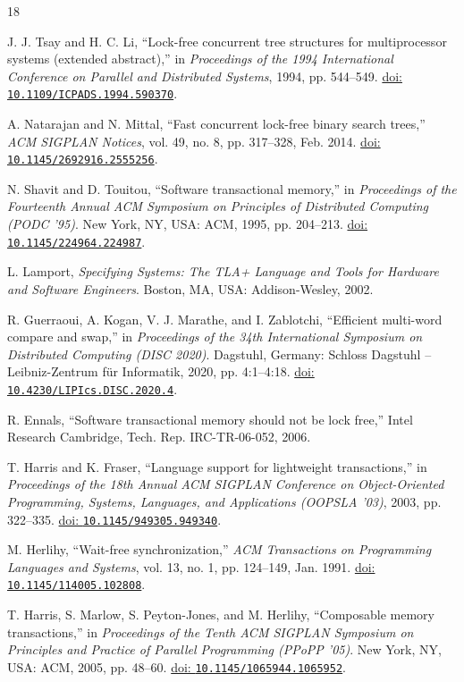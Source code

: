 \newcommand{\doi}[1]{\href{https://doi.org/#1}{doi: \nolinkurl{#1}}}

\begin{thebibliography}{18}

J. J. Tsay and H. C. Li, ``Lock-free concurrent tree structures for multiprocessor systems (extended abstract),'' in \textit{Proceedings of the 1994 International Conference on Parallel and Distributed Systems}, 1994, pp. 544--549. \doi{10.1109/ICPADS.1994.590370}.

A. Natarajan and N. Mittal, ``Fast concurrent lock-free binary search trees,'' \textit{ACM SIGPLAN Notices}, vol. 49, no. 8, pp. 317--328, Feb. 2014. \doi{10.1145/2692916.2555256}.

N. Shavit and D. Touitou, ``Software transactional memory,'' in \textit{Proceedings of the Fourteenth Annual ACM Symposium on Principles of Distributed Computing (PODC '95)}. New York, NY, USA: ACM, 1995, pp. 204--213. \doi{10.1145/224964.224987}.

L. Lamport, \textit{Specifying Systems: The TLA+ Language and Tools for Hardware and Software Engineers}. Boston, MA, USA: Addison-Wesley, 2002.

R. Guerraoui, A. Kogan, V. J. Marathe, and I. Zablotchi, ``Efficient multi-word compare and swap,'' in \textit{Proceedings of the 34th International Symposium on Distributed Computing (DISC 2020)}. Dagstuhl, Germany: Schloss Dagstuhl -- Leibniz-Zentrum für Informatik, 2020, pp. 4:1--4:18. \doi{10.4230/LIPIcs.DISC.2020.4}.

R. Ennals, ``Software transactional memory should not be lock free,'' Intel Research Cambridge, Tech. Rep. IRC-TR-06-052, 2006.

T. Harris and K. Fraser, ``Language support for lightweight transactions,'' in \textit{Proceedings of the 18th Annual ACM SIGPLAN Conference on Object-Oriented Programming, Systems, Languages, and Applications (OOPSLA '03)}, 2003, pp. 322--335. \doi{10.1145/949305.949340}.

M. Herlihy, ``Wait-free synchronization,'' \textit{ACM Transactions on Programming Languages and Systems}, vol. 13, no. 1, pp. 124--149, Jan. 1991. \doi{10.1145/114005.102808}.

T. Harris, S. Marlow, S. Peyton-Jones, and M. Herlihy, ``Composable memory transactions,'' in \textit{Proceedings of the Tenth ACM SIGPLAN Symposium on Principles and Practice of Parallel Programming (PPoPP '05)}. New York, NY, USA: ACM, 2005, pp. 48--60. \doi{10.1145/1065944.1065952}.


\end{thebibliography}
